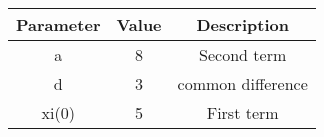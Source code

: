 

    \begin{tabular}{|c|c|c|}
        \hline
        \textbf{Parameter} & \textbf{Value} & \textbf{Description} \\
        \hline
        a     & 8 & Second term \\
        d     & 3 & common difference\\
        xi(0) & 5 & First term \\
        \hline
    \end{tabular}
    
    


